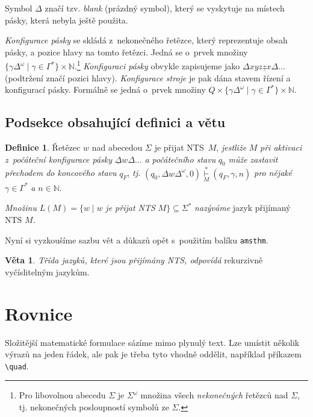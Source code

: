 \documentclass[a4paper, 11pt, twocolumn]{article}
\theoremstyle{definition}
\newtheorem{definition}{Definice}
\newtheorem{lemma}{Věta}
\begin{document}
Symbol $\Delta$ značí tzv. \emph{blank} (prázdný symbol), který se vyskytuje na místech pásky, která nebyla ještě použita.\par
\emph{Konfigurace pásky} se skládá z~nekonečného řetězce, který reprezentuje obsah pásky, a pozice hlavy na tomto řetězci. Jedná se o~prvek množiny $\{\gamma \Delta^{\omega} \mid \gamma \in \Gamma^{*}\} \times \mathbb{N}$.\footnote{Pro libovolnou abecedu $\Sigma$ je $\Sigma^{\omega}$ množina všech \emph{nekonečných} řetězců nad $\Sigma$, tj. nekonečných posloupností symbolů ze $\Sigma$.} 
\emph{Konfiguraci pásky} obvykle zapisujeme jako $\Delta xyz\underline{z}x\Delta\ldots$ (podtržení značí pozici hlavy).
\emph{Konfigurace stroje} je pak dána stavem řízení a konfigurací pásky. Formálně se jedná o~prvek množiny $Q \times \{\gamma \Delta^{\omega} \mid \gamma \in \Gamma^{*}\} \times \mathbb{N}$.

\subsection{Podsekce obsahující definici a větu}
\begin{definition}
\label{def_2}
Řetězec $w$ nad abecedou $\Sigma$ je přijat NTS~$M$,   \emph{jestliže} $M$ \emph{při aktivaci z~počáteční konfigurace pásky} $\underline{\Delta}w\Delta\ldots$ \emph{a počátečního stavu} $q_0$ \emph{může zastavit přechodem do koncového stavu} $q_F$, \emph{tj.} $(q_0,\Delta w \Delta^{\omega},0)\underset{M}{\overset{*}{\vdash}} (q_F,\gamma,n)$ \emph{pro nějaké} $\gamma \in \Gamma^{*}$ \emph{a} $n \in \mathbb{N}$.\par
\emph{Množinu} $L(M) = \{w \mid w $\emph{ je přijat NTS} $M\} \subseteq\Sigma^{*}$ \emph{nazýváme} jazyk přijímaný NTS $M$.

\end{definition}

Nyní si vyzkoušíme sazbu vět a důkazů opět s~použitím balíku \texttt{amsthm}.

\begin{lemma}
\emph{Třída jazyků, které jsou přijímány NTS, odpovídá} rekurzivně vyčíslitelným jazykům.
\end{lemma}

\section{Rovnice}
Složitější matematické formulace sázíme mimo plynulý text. Lze umístit několik výrazů na jeden řádek, ale pak je třeba tyto vhodně oddělit, například příkazem \verb|\quad|.
\end{document}
